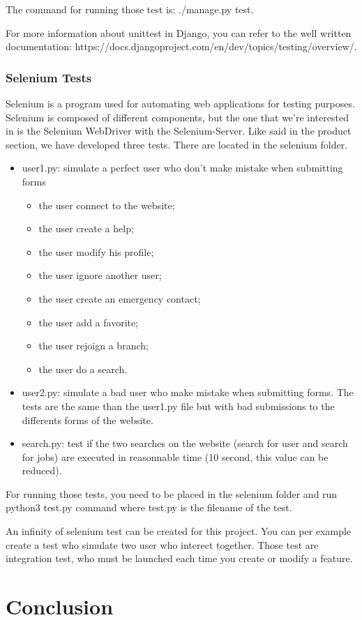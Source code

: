 \documentclass[11pt, a4paper]{article}      %
\begin{document}
The command for running those test is: ./manage.py test.

For more information about unittest in Django, you can refer to the well written documentation: https://docs.djangoproject.com/en/dev/topics/testing/overview/.


\subsubsection{Selenium Tests}


Selenium is a program used for automating web applications for testing purposes. Selenium is composed of different components, but the one that we’re interested in is the Selenium WebDriver with the Selenium-Server. Like said in the product section, we have developed three tests. There are located in the selenium folder.

\begin{itemize}
\item user1.py: simulate a perfect user who don't make mistake when submitting forms
\begin{itemize}
    \item the user connect to the website;
    \item the user create a help;
    \item the user modify his profile;
    \item the user ignore another user;
    \item the user create an emergency contact;
    \item the user add a favorite;
    \item the user rejoign a branch;
    \item the user do a search.
\end{itemize}
\item user2.py: simulate a bad user who make mistake when submitting forms. The tests are the same than the user1.py file but with bad submissions to the differents forms of the website.
\item search.py: test if the two searches on the website (search for user and search for jobs) are executed in reasonnable time (10 second, this value can be reduced).
\end{itemize}

For running those tests, you need to be placed in the selenium folder and run python3 test.py command where test.py is the filename of the test.

An infinity of selenium test can be created for this project. You can per example create a test who simulate two user who interect together. Those test are integration test, who must be launched each time you create or modify a feature.
\section{Conclusion}
\end{document}
